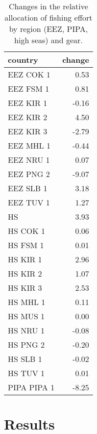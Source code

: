 \documentclass[11pt,]{article}
\begin{document}
\begin{table}[H]

\caption{\label{tab:unnamed-chunk-9}\label{tab:ba_disp}Changes in the relative allocation of fishing effort by region (EEZ, PIPA, high seas) and gear.}
\centering
\begin{tabular}[t]{lr}
\toprule
country & change\\
\midrule
EEZ COK 1 & 0.53\\
EEZ FSM 1 & 0.81\\
EEZ KIR 1 & -0.16\\
EEZ KIR 2 & 4.50\\
EEZ KIR 3 & -2.79\\
\addlinespace
EEZ MHL 1 & -0.44\\
EEZ NRU 1 & 0.07\\
EEZ PNG 2 & -9.07\\
EEZ SLB 1 & 3.18\\
EEZ TUV 1 & 1.27\\
\addlinespace
HS & 3.93\\
HS COK 1 & 0.06\\
HS FSM 1 & 0.01\\
HS KIR 1 & 2.96\\
HS KIR 2 & 1.07\\
\addlinespace
HS KIR 3 & 2.53\\
HS MHL 1 & 0.11\\
HS MUS 1 & 0.00\\
HS NRU 1 & -0.08\\
HS PNG 2 & -0.20\\
\addlinespace
HS SLB 1 & -0.02\\
HS TUV 1 & 0.01\\
PIPA PIPA 1 & -8.25\\
\bottomrule
\end{tabular}
\end{table}

\clearpage

\hypertarget{results}{%
\section{Results}\label{results}}
\end{document}

